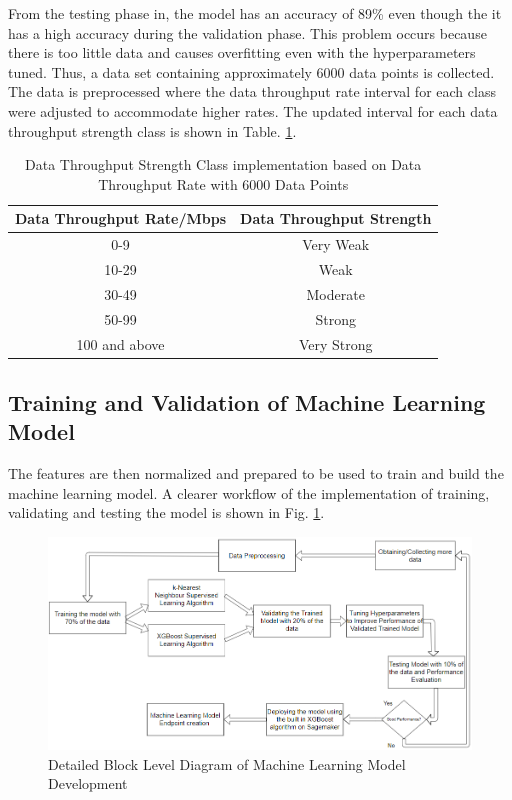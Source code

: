  From the testing phase in, the model has an accuracy of 89\% even though the it has a high accuracy during the validation phase. This problem occurs because there is too little data and causes overfitting even with the hyperparameters tuned. Thus, a data set containing approximately 6000 data points is collected. The data is preprocessed where the data throughput rate interval for each class were adjusted to accommodate higher rates. The updated interval for each data throughput strength class is shown in Table. \ref{table:class2}.
 
\begin{table}[ht]
\centering
\begin{center}
\begin{tabular}{ |c|c| } 
 \hline
 Data Throughput Rate/Mbps & Data Throughput Strength\\ 
  \hline\hline
0-9 & Very Weak\\ 
10-29 & Weak\\ 
30-49 & Moderate \\ 
50-99 & Strong\\ 
100 and above & Very Strong\\ 

 \hline
\end{tabular}
\caption{Data Throughput Strength Class implementation based on Data Throughput Rate with 6000 Data Points}
\label{table:class2}
\end{center}
\end{table}
 
\subsection{Training and Validation of Machine Learning Model} 
The features are then normalized and prepared to be used to train and build the machine learning model. A clearer workflow of the implementation of training, validating and testing the model is shown in Fig. \ref{fig_mlmodel}.

\begin{figure} [ht]
    \centering
    \includegraphics[scale = 0.69]{pages/Chapter4/Chapter 4 Images/Work Flow.PNG}
    \caption{Detailed Block Level Diagram of Machine Learning Model Development}
    \label{fig_mlmodel}
\end{figure}

